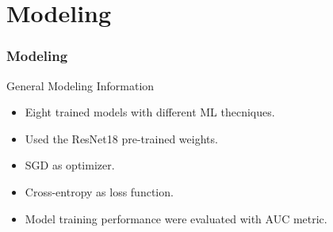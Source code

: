 \documentclass[dvipsnames,mathserif]{beamer}
\begin{document}
{\begin{frame}
    \end{frame}



%
    \section{Modeling}

    \begin{frame}
      \frametitle{Modeling}
    \end{frame}

    \begin{frame}

      \large General Modeling Information
          \vspace{0.25cm}

      \footnotesize

      \begin{itemize}
        \item Eight trained models with different ML thecniques.
        \item Used the ResNet18 pre-trained weights.
        \item SGD as optimizer.
        \item Cross-entropy as loss function.
        \item Model training performance were evaluated with AUC metric.
      \end{itemize}

    \end{frame}

    \begin{frame}


  \begin{table}


\end{table}
\end{frame}}
\end{document}
